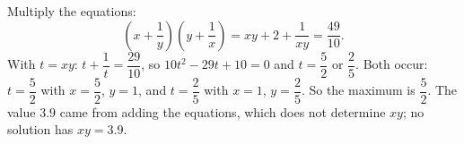Multiply the equations:
\[\left(x+\dfrac{1}{y}\right)\left(y+\dfrac{1}{x}\right)=xy+2+\dfrac{1}{xy}=\dfrac{49}{10}.\]
With $t=xy$: $t+\dfrac{1}{t}=\dfrac{29}{10}$, so $10t^2-29t+10=0$ and $t=\dfrac{5}{2}$ or $\dfrac{2}{5}$. Both occur: $t=\dfrac{5}{2}$ with $x=\dfrac{5}{2}$, $y=1$, and $t=\dfrac{2}{5}$ with $x=1$, $y=\dfrac{2}{5}$. So the maximum is $\boxed{\dfrac{5}{2}}$. The value $3.9$ came from adding the equations, which does not determine $xy$; no solution has $xy=3.9$.
